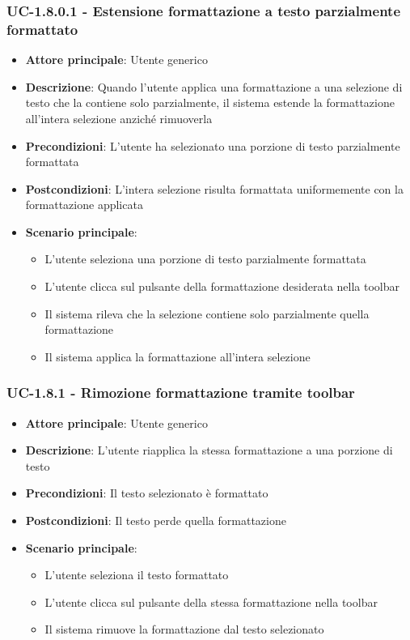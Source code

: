 \documentclass[11pt,a4paper]{article}
\begin{document}
\subsubsection{UC-1.8.0.1 - Estensione formattazione a testo parzialmente formattato}
\begin{itemize}
    \item \textbf{Attore principale}: Utente generico
    \item \textbf{Descrizione}: Quando l'utente applica una formattazione a una selezione di testo che la contiene solo parzialmente, il sistema estende la formattazione all'intera selezione anziché rimuoverla
    \item \textbf{Precondizioni}: L'utente ha selezionato una porzione di testo parzialmente formattata
    \item \textbf{Postcondizioni}: L'intera selezione risulta formattata uniformemente con la formattazione applicata
    \item \textbf{Scenario principale}:
        \begin{itemize}
            \item L'utente seleziona una porzione di testo parzialmente formattata
            \item L'utente clicca sul pulsante della formattazione desiderata nella toolbar
            \item Il sistema rileva che la selezione contiene solo parzialmente quella formattazione
            \item Il sistema applica la formattazione all'intera selezione
        \end{itemize}
\end{itemize}

\subsubsection{UC-1.8.1 - Rimozione formattazione tramite toolbar}
\begin{itemize}
    \item \textbf{Attore principale}: Utente generico
    \item \textbf{Descrizione}: L'utente riapplica la stessa formattazione a una porzione di testo
    \item \textbf{Precondizioni}: Il testo selezionato è formattato
    \item \textbf{Postcondizioni}: Il testo perde quella formattazione
    \item \textbf{Scenario principale}:
        \begin{itemize}
            \item L'utente seleziona il testo formattato
            \item L'utente clicca sul pulsante della stessa formattazione nella toolbar
            \item Il sistema rimuove la formattazione dal testo selezionato
        \end{itemize}
\end{itemize}
\end{document}
